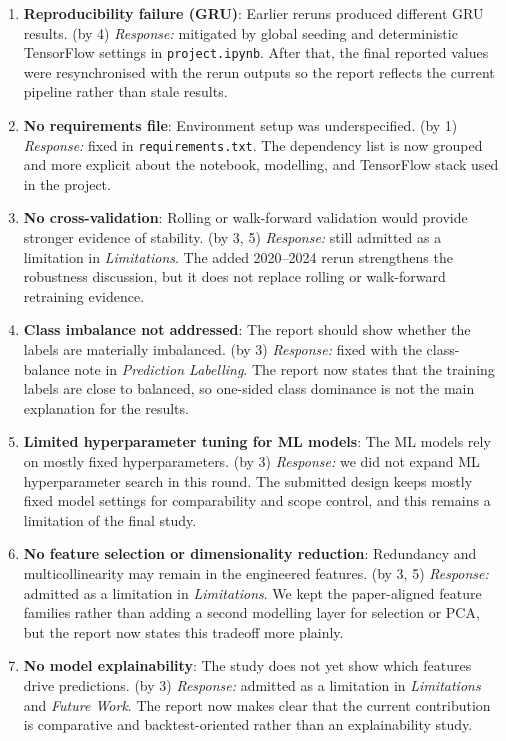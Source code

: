 \documentclass[12pt]{article}
\begin{document}
\begin{enumerate}[leftmargin=1.5em]
    \item \textbf{Reproducibility failure (GRU)}: Earlier reruns produced different GRU results. (by 4) \textit{Response:} mitigated by global seeding and deterministic TensorFlow settings in \texttt{project.ipynb}. After that, the final reported values were resynchronised with the rerun outputs so the report reflects the current pipeline rather than stale results.
    \item \textbf{No requirements file}: Environment setup was underspecified. (by 1) \textit{Response:} fixed in \texttt{requirements.txt}. The dependency list is now grouped and more explicit about the notebook, modelling, and TensorFlow stack used in the project.
    \item \textbf{No cross-validation}: Rolling or walk-forward validation would provide stronger evidence of stability. (by 3, 5) \textit{Response:} still admitted as a limitation in \emph{Limitations}. The added 2020--2024 rerun strengthens the robustness discussion, but it does not replace rolling or walk-forward retraining evidence.
    \item \textbf{Class imbalance not addressed}: The report should show whether the labels are materially imbalanced. (by 3) \textit{Response:} fixed with the class-balance note in \emph{Prediction Labelling}. The report now states that the training labels are close to balanced, so one-sided class dominance is not the main explanation for the results.
    \item \textbf{Limited hyperparameter tuning for ML models}: The ML models rely on mostly fixed hyperparameters. (by 3) \textit{Response:} we did not expand ML hyperparameter search in this round. The submitted design keeps mostly fixed model settings for comparability and scope control, and this remains a limitation of the final study.
    \item \textbf{No feature selection or dimensionality reduction}: Redundancy and multicollinearity may remain in the engineered features. (by 3, 5) \textit{Response:} admitted as a limitation in \emph{Limitations}. We kept the paper-aligned feature families rather than adding a second modelling layer for selection or PCA, but the report now states this tradeoff more plainly.
    \item \textbf{No model explainability}: The study does not yet show which features drive predictions. (by 3) \textit{Response:} admitted as a limitation in \emph{Limitations} and \emph{Future Work}. The report now makes clear that the current contribution is comparative and backtest-oriented rather than an explainability study.
\end{enumerate}
\endgroup
\end{document}

